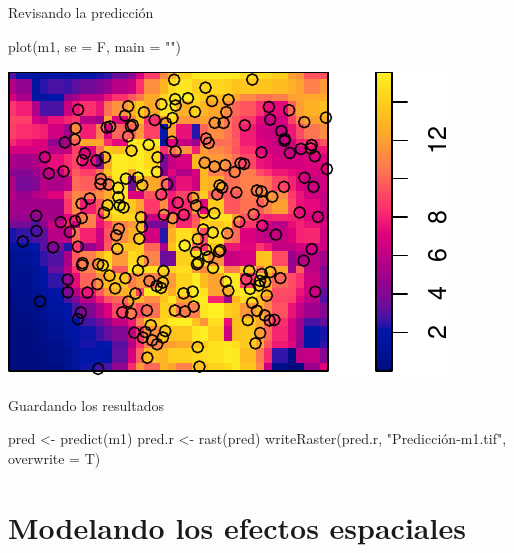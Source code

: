 \documentclass[
  11pt,
  ignorenonframetext,
]{beamer}
\newenvironment{Shaded}{}{}
\newcommand{\AttributeTok}[1]{\textcolor[rgb]{0.49,0.56,0.16}{#1}}
\newcommand{\FunctionTok}[1]{\textcolor[rgb]{0.02,0.16,0.49}{#1}}
\newcommand{\NormalTok}[1]{#1}
\newcommand{\OtherTok}[1]{\textcolor[rgb]{0.00,0.44,0.13}{#1}}
\newcommand{\StringTok}[1]{\textcolor[rgb]{0.25,0.44,0.63}{#1}}
\begin{document}
\begin{frame}[fragile]{Revisando la predicción}
\protect\hypertarget{revisando-la-predicciuxf3n}{}
\begin{Shaded}
\begin{Highlighting}[]
\FunctionTok{plot}\NormalTok{(m1, }\AttributeTok{se =}\NormalTok{ F, }\AttributeTok{main =} \StringTok{""}\NormalTok{)}
\end{Highlighting}
\end{Shaded}

\begin{center}\includegraphics{Tutorial-spatstat-2_files/figure-beamer/unnamed-chunk-22-1} \end{center}
\end{frame}

\begin{frame}[fragile]{Guardando los resultados}
\protect\hypertarget{guardando-los-resultados}{}
\begin{Shaded}
\begin{Highlighting}[]
\NormalTok{pred }\OtherTok{\textless{}{-}} \FunctionTok{predict}\NormalTok{(m1)}
\NormalTok{pred.r }\OtherTok{\textless{}{-}} \FunctionTok{rast}\NormalTok{(pred)}
\FunctionTok{writeRaster}\NormalTok{(pred.r, }\StringTok{"Predicción{-}m1.tif"}\NormalTok{,}
            \AttributeTok{overwrite =}\NormalTok{ T)}
\end{Highlighting}
\end{Shaded}
\end{frame}

\hypertarget{modelando-los-efectos-espaciales}{%
\section{Modelando los efectos
espaciales}\label{modelando-los-efectos-espaciales}}
\end{document}

